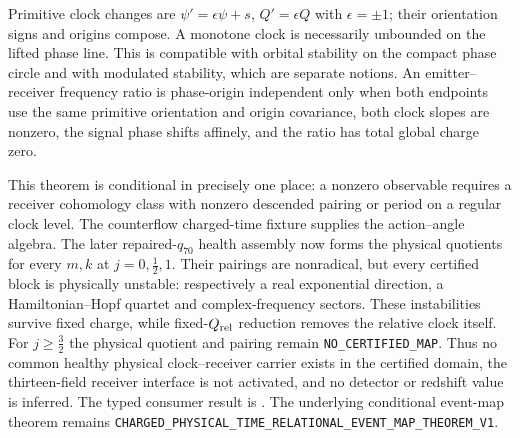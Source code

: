 \documentclass[11pt]{article}
\theoremstyle{definition}
\theoremstyle{remark}
\begin{document}
Primitive clock changes are
$\psi'=\epsilon\psi+s$, $Q'=\epsilon Q$ with
$\epsilon=\pm1$; their orientation signs and origins compose.  A monotone
clock is necessarily unbounded on the lifted phase line.  This is compatible
with orbital stability on the compact phase circle and with modulated
stability, which are separate notions.  An emitter--receiver frequency ratio
is phase-origin independent only when both endpoints use the same primitive
orientation and origin covariance, both clock slopes are nonzero, the signal
phase shifts affinely, and the ratio has total global charge zero.

This theorem is conditional in precisely one place: a nonzero observable
requires a receiver cohomology class with nonzero descended pairing or period
on a regular clock level.  The counterflow charged-time fixture supplies the
action--angle algebra.  The later repaired-$q_{70}$ health assembly now forms
the physical quotients for every $m,k$ at $j=0,\frac12,1$.  Their pairings are
nonradical, but every certified block is physically unstable: respectively a
real exponential direction, a Hamiltonian--Hopf quartet and complex-frequency
sectors.  These instabilities survive fixed charge, while fixed-$Q_{\rm rel}$
reduction removes the relative clock itself.  For $j\geq\frac32$ the physical
quotient and pairing remain \texttt{NO\_CERTIFIED\_MAP}.  Thus no common
healthy physical clock--receiver carrier exists in the certified domain, the
thirteen-field receiver interface is not activated, and no detector or
redshift value is inferred.  The typed consumer result is
.
The underlying conditional event-map theorem remains
\texttt{CHARGED\_PHYSICAL\_TIME\_RELATIONAL\_EVENT\_MAP\_THEOREM\_V1}.
\end{document}
